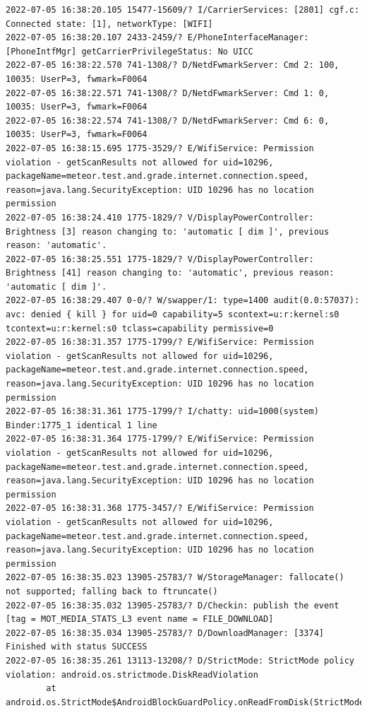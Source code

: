 \documentclass[a4paper,12pt]{book}
\begin{document}
\begin{lstlisting}
2022-07-05 16:38:20.105 15477-15609/? I/CarrierServices: [2801] cgf.c: Connected state: [1], networkType: [WIFI]
2022-07-05 16:38:20.107 2433-2459/? E/PhoneInterfaceManager: [PhoneIntfMgr] getCarrierPrivilegeStatus: No UICC
2022-07-05 16:38:22.570 741-1308/? D/NetdFwmarkServer: Cmd 2: 100, 10035: UserP=3, fwmark=F0064
2022-07-05 16:38:22.571 741-1308/? D/NetdFwmarkServer: Cmd 1: 0, 10035: UserP=3, fwmark=F0064
2022-07-05 16:38:22.574 741-1308/? D/NetdFwmarkServer: Cmd 6: 0, 10035: UserP=3, fwmark=F0064
2022-07-05 16:38:15.695 1775-3529/? E/WifiService: Permission violation - getScanResults not allowed for uid=10296, packageName=meteor.test.and.grade.internet.connection.speed, reason=java.lang.SecurityException: UID 10296 has no location permission
2022-07-05 16:38:24.410 1775-1829/? V/DisplayPowerController: Brightness [3] reason changing to: 'automatic [ dim ]', previous reason: 'automatic'.
2022-07-05 16:38:25.551 1775-1829/? V/DisplayPowerController: Brightness [41] reason changing to: 'automatic', previous reason: 'automatic [ dim ]'.
2022-07-05 16:38:29.407 0-0/? W/swapper/1: type=1400 audit(0.0:57037): avc: denied { kill } for uid=0 capability=5 scontext=u:r:kernel:s0 tcontext=u:r:kernel:s0 tclass=capability permissive=0
2022-07-05 16:38:31.357 1775-1799/? E/WifiService: Permission violation - getScanResults not allowed for uid=10296, packageName=meteor.test.and.grade.internet.connection.speed, reason=java.lang.SecurityException: UID 10296 has no location permission
2022-07-05 16:38:31.361 1775-1799/? I/chatty: uid=1000(system) Binder:1775_1 identical 1 line
2022-07-05 16:38:31.364 1775-1799/? E/WifiService: Permission violation - getScanResults not allowed for uid=10296, packageName=meteor.test.and.grade.internet.connection.speed, reason=java.lang.SecurityException: UID 10296 has no location permission
2022-07-05 16:38:31.368 1775-3457/? E/WifiService: Permission violation - getScanResults not allowed for uid=10296, packageName=meteor.test.and.grade.internet.connection.speed, reason=java.lang.SecurityException: UID 10296 has no location permission
2022-07-05 16:38:35.023 13905-25783/? W/StorageManager: fallocate() not supported; falling back to ftruncate()
2022-07-05 16:38:35.032 13905-25783/? D/Checkin: publish the event [tag = MOT_MEDIA_STATS_L3 event name = FILE_DOWNLOAD]
2022-07-05 16:38:35.034 13905-25783/? D/DownloadManager: [3374] Finished with status SUCCESS
2022-07-05 16:38:35.261 13113-13208/? D/StrictMode: StrictMode policy violation: android.os.strictmode.DiskReadViolation
        at android.os.StrictMode$AndroidBlockGuardPolicy.onReadFromDisk(StrictMode.java:1571)

\end{lstlisting}
\end{document}
